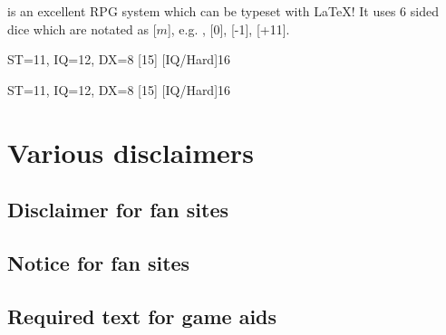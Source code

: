 \documentclass{article}
\begin{document}
\gurps is an excellent RPG system which can be typeset with \LaTeX{}! It uses 6
sided dice which are notated as [$m$], e.g. , [0], [-1], [+11].

\begin{character}{ST=11, IQ=12, DX=8}
  [15]
  [IQ/Hard]{16}
\end{character}

\begin{lens}{ST=11, IQ=12, DX=8}
  [15]
  [IQ/Hard]{16}
\end{lens}

\section{Various disclaimers}
\label{sec:various-disclaimers}

\subsection{Disclaimer for fan sites}
\label{sec:disclaimer-fan-sites}

\SJGamesOnlinePolicyDisclaimer

\subsection{Notice for fan sites}
\label{sec:disclaimer-fan-sites}

\SJGamesOnlinePolicyNotice

\subsection{Required text for game aids}
\label{sec:disclaimer-fan-sites}

\end{document}
